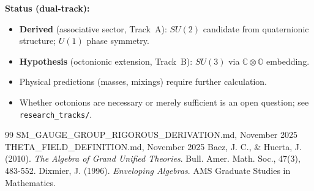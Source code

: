 \documentclass[12pt]{article}
\newcommand{\C}{\mathbb{C}}
\renewcommand{\O}{\mathbb{O}}
\begin{document}
\textbf{Status (dual-track):}
\begin{itemize}
\item \textbf{Derived} (associative sector, Track~A): $SU(2)$ candidate from quaternionic structure; $U(1)$ phase symmetry.
\item \textbf{Hypothesis} (octonionic extension, Track~B): $SU(3)$ via $\C \otimes \O$ embedding.
\item Physical predictions (masses, mixings) require further calculation.
\item Whether octonions are necessary or merely sufficient is an open question; see \texttt{research\_tracks/}.
\end{itemize}

\begin{thebibliography}{99}
 SM\_GAUGE\_GROUP\_RIGOROUS\_DERIVATION.md, November 2025
 THETA\_FIELD\_DEFINITION.md, November 2025
 Baez, J. C., \& Huerta, J. (2010). \textit{The Algebra of Grand Unified Theories}. Bull. Amer. Math. Soc., 47(3), 483-552.
 Dixmier, J. (1996). \textit{Enveloping Algebras}. AMS Graduate Studies in Mathematics.
\end{thebibliography}
\end{document}

